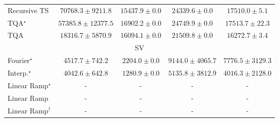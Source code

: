 \begin{tabular}{l|cccc|}
Recursive TS & {\cellcolor[HTML]{004F2D}} \color[HTML]{F1F1F1} $70768.3\pm 9211.8$ & {\cellcolor[HTML]{FEFFDF}} \color[HTML]{000000} $15437.9\pm 0.0$ & {\cellcolor[HTML]{EDF8B1}} \color[HTML]{000000} $24339.6\pm 0.0$ & {\cellcolor[HTML]{FCFED3}} \color[HTML]{000000} $17510.0\pm 5.1$ \\
TQA$^\star$ & {\cellcolor[HTML]{278946}} \color[HTML]{F1F1F1} $57385.8\pm 12377.5$ & {\cellcolor[HTML]{FCFED7}} \color[HTML]{000000} $16902.2\pm 0.0$ & {\cellcolor[HTML]{EBF7B0}} \color[HTML]{000000} $24749.9\pm 0.0$ & {\cellcolor[HTML]{FCFED3}} \color[HTML]{000000} $17513.7\pm 22.3$ \\
TQA & {\cellcolor[HTML]{FBFDCE}} \color[HTML]{000000} $18316.7\pm 5870.9$ & {\cellcolor[HTML]{FDFEDB}} \color[HTML]{000000} $16094.1\pm 0.0$ & {\cellcolor[HTML]{F7FCBA}} \color[HTML]{000000} $21509.8\pm 0.0$ & {\cellcolor[HTML]{FDFEDA}} \color[HTML]{000000} $16272.7\pm 3.4$ \\
\cline{1-5}
\multicolumn{5}{c}{\rule{0pt}{8pt}SV} \\
\midrule
Fourier$^\star$ & {\cellcolor[HTML]{97B7D7}} \color[HTML]{000000} $4517.7\pm 742.2$ & {\cellcolor[HTML]{EDE8F3}} \color[HTML]{000000} $2204.0\pm 0.0$ & {\cellcolor[HTML]{023858}} \color[HTML]{F1F1F1} $9144.0\pm 4065.7$ & {\cellcolor[HTML]{04629A}} \color[HTML]{F1F1F1} $7776.5\pm 3129.3$ \\
Interp.$^\star$ & {\cellcolor[HTML]{AFC1DD}} \color[HTML]{000000} $4042.6\pm 642.8$ & {\cellcolor[HTML]{FFF7FB}} \color[HTML]{000000} $1280.9\pm 0.0$ & {\cellcolor[HTML]{78ABD0}} \color[HTML]{F1F1F1} $5135.8\pm 3812.9$ & {\cellcolor[HTML]{AFC1DD}} \color[HTML]{000000} $4016.3\pm 2128.0$ \\
Linear Ramp$^\star$ & {\cellcolor[HTML]{000000}} \color[HTML]{F1F1F1} {\cellcolor{white}} \color{black} - & {\cellcolor[HTML]{000000}} \color[HTML]{F1F1F1} {\cellcolor{white}} \color{black} - & {\cellcolor[HTML]{000000}} \color[HTML]{F1F1F1} {\cellcolor{white}} \color{black} - & {\cellcolor[HTML]{000000}} \color[HTML]{F1F1F1} {\cellcolor{white}} \color{black} - \\
Linear Ramp & {\cellcolor[HTML]{000000}} \color[HTML]{F1F1F1} {\cellcolor{white}} \color{black} - & {\cellcolor[HTML]{000000}} \color[HTML]{F1F1F1} {\cellcolor{white}} \color{black} - & {\cellcolor[HTML]{000000}} \color[HTML]{F1F1F1} {\cellcolor{white}} \color{black} - & {\cellcolor[HTML]{000000}} \color[HTML]{F1F1F1} {\cellcolor{white}} \color{black} - \\
Linear Ramp$^\dagger$ & {\cellcolor[HTML]{000000}} \color[HTML]{F1F1F1} {\cellcolor{white}} \color{black} - & {\cellcolor[HTML]{000000}} \color[HTML]{F1F1F1} {\cellcolor{white}} \color{black} - & {\cellcolor[HTML]{000000}} \color[HTML]{F1F1F1} {\cellcolor{white}} \color{black} - & {\cellcolor[HTML]{000000}} \color[HTML]{F1F1F1} {\cellcolor{white}} \color{black} - \\

\end{tabular}
